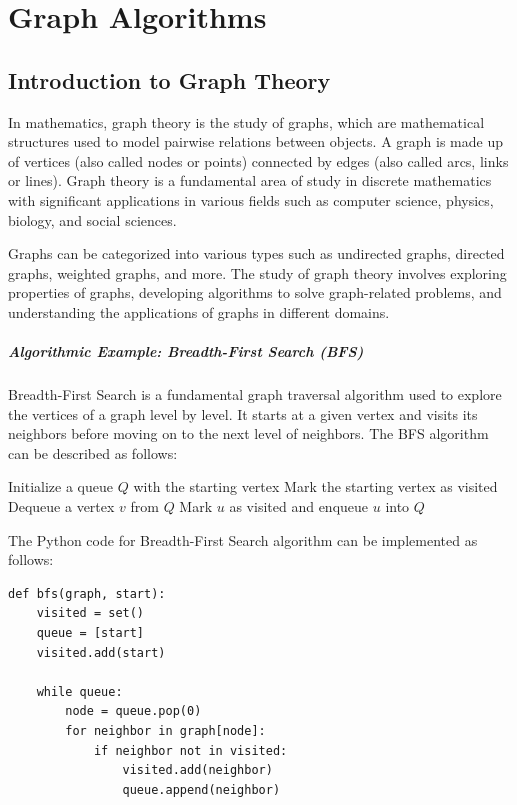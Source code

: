 \documentclass[12pt]{book} %
\begin{document}
\chapter{Graph Algorithms}
\section{Introduction to Graph Theory}
In mathematics, graph theory is the study of graphs, which are mathematical structures used to model pairwise relations between objects. A graph is made up of vertices (also called nodes or points) connected by edges (also called arcs, links or lines). Graph theory is a fundamental area of study in discrete mathematics with significant applications in various fields such as computer science, physics, biology, and social sciences.

Graphs can be categorized into various types such as undirected graphs, directed graphs, weighted graphs, and more. The study of graph theory involves exploring properties of graphs, developing algorithms to solve graph-related problems, and understanding the applications of graphs in different domains.

\paragraph{Algorithmic Example: Breadth-First Search (BFS)}
\FloatBarrier
Breadth-First Search is a fundamental graph traversal algorithm used to explore the vertices of a graph level by level. It starts at a given vertex and visits its neighbors before moving on to the next level of neighbors.
\FloatBarrier
The BFS algorithm can be described as follows:
\FloatBarrier
\begin{algorithm}
\caption{Breadth-First Search}
\begin{algorithmic}
\State Initialize a queue $Q$ with the starting vertex
\State Mark the starting vertex as visited
    \State Dequeue a vertex $v$ from $Q$
            \State Mark $u$ as visited and enqueue $u$ into $Q$
        \EndIf
    \EndFor
\EndWhile
\end{algorithmic}
\end{algorithm}
\FloatBarrier
The Python code for Breadth-First Search algorithm can be implemented as follows:
\FloatBarrier
\begin{lstlisting}
def bfs(graph, start):
    visited = set()
    queue = [start]
    visited.add(start)
    
    while queue:
        node = queue.pop(0)
        for neighbor in graph[node]:
            if neighbor not in visited:
                visited.add(neighbor)
                queue.append(neighbor)
\end{lstlisting}
\end{document}
